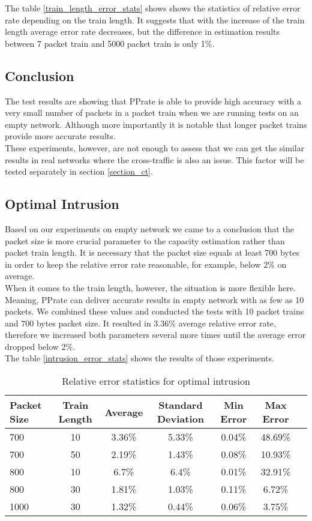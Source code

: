 The table \ref{train_length_error_stats} shows shows the statistics of relative error rate depending on the train length. It suggests that with the increase of the train length average error rate decreases, but the difference in estimation results between 7 packet train and 5000 packet train is only 1\%.

\subsection*{Conclusion}
The test results are showing that PPrate is able to provide high accuracy with a very small number of packets in a packet train when we are running tests on an empty network. Although more importantly it is notable that longer packet trains provide more accurate results. \\
These experiments, however, are not enough to assess that we can get the similar results in real networks where the cross-traffic is also an issue. This factor will be tested separately in section \ref{section_ct}. 




\subsection{Optimal Intrusion}
Based on our experiments on empty network we came to a conclusion that the packet size is more crucial parameter to the capacity estimation rather than packet train length. It is necessary that the packet size equals at least 700 bytes in order to keep the relative error rate reasonable, for example, below 2\% on average. \\
When it comes to the train length, however, the situation is more flexible here. Meaning, PPrate can deliver accurate results in empty network with as few as 10 packets. We combined these values and conducted the tests with 10 packet trains and 700 bytes packet size. It resulted in 3.36\% average relative error rate, therefore we increased both parameters several more times until the average error dropped below 2\%. \\
The table \ref{intrusion_error_stats} shows the results of those experiments. 

\begin{table}[h!]
  \centering
  \caption{Relative error statistics for optimal intrusion}
  \label{intrusion_error_stats}
\begin{tabular}{l|c|c|c|c|c|c}
\toprule
 Packet Size & Train Length & Average & Standard Deviation & Min Error & Max Error \\ \midrule
  \label{}
    700 & 10 & 3.36\% & 5.33\% & 0.04\% & 48.69\% \\
    700 & 50 & 2.19\% & 1.43\% & 0.08\% & 10.93\% \\
    800 & 10 & 6.7\% & 6.4\% & 0.01\% & 32.91\% \\
    800 & 30 & 1.81\% & 1.03\% & 0.11\% & 6.72\% \\
    1000 & 30 & 1.32\% & 0.44\% & 0.06\% & 3.75\% \\ \bottomrule
  \end{tabular}      
\end{table}


